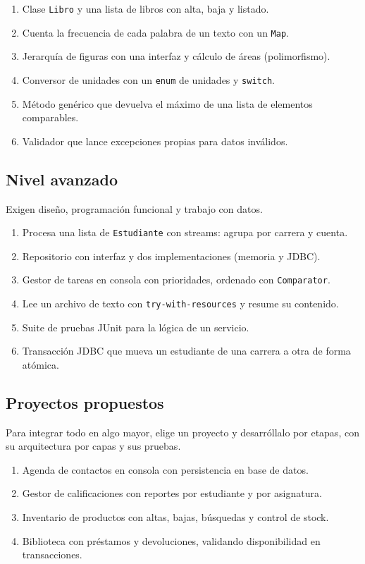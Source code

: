\documentclass[11pt]{article}
\begin{document}
\begin{enumerate}[leftmargin=1.7em,itemsep=3pt,topsep=2pt]
\item Clase \texttt{Libro} y una lista de libros con alta, baja y listado.
\item Cuenta la frecuencia de cada palabra de un texto con un \texttt{Map}.
\item Jerarquía de figuras con una interfaz y cálculo de áreas (polimorfismo).
\item Conversor de unidades con un \texttt{enum} de unidades y \texttt{switch}.
\item Método genérico que devuelva el máximo de una lista de elementos comparables.
\item Validador que lance excepciones propias para datos inválidos.
\end{enumerate}
\subsection{Nivel avanzado}
Exigen diseño, programación funcional y trabajo con datos.

\begin{enumerate}[leftmargin=1.7em,itemsep=3pt,topsep=2pt]
\item Procesa una lista de \texttt{Estudiante} con streams: agrupa por carrera y cuenta.
\item Repositorio con interfaz y dos implementaciones (memoria y JDBC).
\item Gestor de tareas en consola con prioridades, ordenado con \texttt{Comparator}.
\item Lee un archivo de texto con \texttt{try-with-resources} y resume su contenido.
\item Suite de pruebas JUnit para la lógica de un servicio.
\item Transacción JDBC que mueva un estudiante de una carrera a otra de forma atómica.
\end{enumerate}
\subsection{Proyectos propuestos}
Para integrar todo en algo mayor, elige un proyecto y desarróllalo por etapas, con su arquitectura por capas y sus pruebas.

\begin{enumerate}[leftmargin=1.7em,itemsep=3pt,topsep=2pt]
\item Agenda de contactos en consola con persistencia en base de datos.
\item Gestor de calificaciones con reportes por estudiante y por asignatura.
\item Inventario de productos con altas, bajas, búsquedas y control de stock.
\item Biblioteca con préstamos y devoluciones, validando disponibilidad en transacciones.
\end{enumerate}
\end{document}
